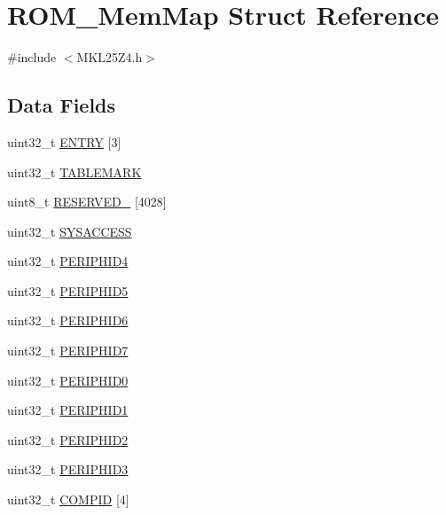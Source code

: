 \hypertarget{struct_r_o_m___mem_map}{}\section{R\+O\+M\+\_\+\+Mem\+Map Struct Reference}
\label{struct_r_o_m___mem_map}


{\ttfamily \#include $<$M\+K\+L25\+Z4.\+h$>$}

\subsection*{Data Fields}
\begin{DoxyCompactItemize}
\item 
uint32\+\_\+t \hyperlink{struct_r_o_m___mem_map_ae744813808d96459e3920bade61dcc96}{E\+N\+T\+RY} \mbox{[}3\mbox{]}
\item 
uint32\+\_\+t \hyperlink{struct_r_o_m___mem_map_a663e5f468cf810e6f1d672690b63b141}{T\+A\+B\+L\+E\+M\+A\+RK}
\item 
uint8\+\_\+t \hyperlink{struct_r_o_m___mem_map_a086169a392fc8eedf1d3a111b034fa69}{R\+E\+S\+E\+R\+V\+E\+D\+\_} \mbox{[}4028\mbox{]}
\item 
uint32\+\_\+t \hyperlink{struct_r_o_m___mem_map_a08aba21ee3870b9eea15463bf46411a4}{S\+Y\+S\+A\+C\+C\+E\+SS}
\item 
uint32\+\_\+t \hyperlink{struct_r_o_m___mem_map_a77e302caa85d43fc41bb379c67bb2d29}{P\+E\+R\+I\+P\+H\+I\+D4}
\item 
uint32\+\_\+t \hyperlink{struct_r_o_m___mem_map_a136c3c65e70983bdce4538ed35668d26}{P\+E\+R\+I\+P\+H\+I\+D5}
\item 
uint32\+\_\+t \hyperlink{struct_r_o_m___mem_map_a649df8358a45f63eb1c5322beee352f7}{P\+E\+R\+I\+P\+H\+I\+D6}
\item 
uint32\+\_\+t \hyperlink{struct_r_o_m___mem_map_af744edcf30aecea70b419fce22ee5299}{P\+E\+R\+I\+P\+H\+I\+D7}
\item 
uint32\+\_\+t \hyperlink{struct_r_o_m___mem_map_ace4dd72e12e50c9ae1e3af145ed542ba}{P\+E\+R\+I\+P\+H\+I\+D0}
\item 
uint32\+\_\+t \hyperlink{struct_r_o_m___mem_map_ac2959cf5e34f358ff003caebf035e051}{P\+E\+R\+I\+P\+H\+I\+D1}
\item 
uint32\+\_\+t \hyperlink{struct_r_o_m___mem_map_a9fa6ff1f979408d3135dd17dbef20050}{P\+E\+R\+I\+P\+H\+I\+D2}
\item 
uint32\+\_\+t \hyperlink{struct_r_o_m___mem_map_a760f0f060bb682064909ba3c577f7e80}{P\+E\+R\+I\+P\+H\+I\+D3}
\item 
uint32\+\_\+t \hyperlink{struct_r_o_m___mem_map_a767dbeb1dc65d81e85c679c91268f2d0}{C\+O\+M\+P\+ID} \mbox{[}4\mbox{]}
\end{DoxyCompactItemize}


